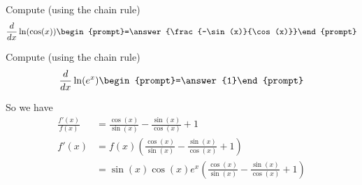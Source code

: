 \documentclass{ximera}
\begin{document}
\begin{problem}
  Compute (using the chain rule)
  \[
  \ddx \ln(\cos(x))  \begin{prompt}=\answer{\frac{-\sin(x)}{\cos(x)}}\end{prompt}
  \]
\end{problem}

\begin{problem}
  Compute (using the chain rule)
  \[
  \ddx \ln(e^x)  \begin{prompt}=\answer{1}\end{prompt}
  \]
\end{problem}

So we have
\begin{align*}
  \frac{f'(x)}{f(x)} &= \frac{\cos(x)}{\sin(x)} - \frac{\sin(x)}{\cos(x)} + 1\\
  f'(x) &= f(x) \left(\frac{\cos(x)}{\sin(x)} - \frac{\sin(x)}{\cos(x)} + 1\right)\\
  &= \sin(x)\cos(x)e^x\left(\frac{\cos(x)}{\sin(x)} - \frac{\sin(x)}{\cos(x)} + 1\right)
\end{align*}




\end{document}
